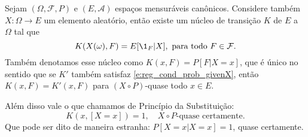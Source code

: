 \begin{corollary}
  \label{c:princ_substit}
  Sejam $(\Omega, \mathcal{F}, P)$ e $(E, \mathcal{A})$ espaços mensuráveis canônicos.
  Considere também $X: \Omega \to E$ um elemento aleatório, então existe um núcleo de transição $K$ de $E$ a $\Omega$ tal que
  \begin{equation}
    \label{e:reg_cond_prob_givenX}
    K(X(\omega), F) = E[\1_{F} | X], \text{ para todo $F \in \mathcal{F}$}.
  \end{equation}
  Também denotamos esse núcleo como $K(x, F) = P[F | X = x]$, que é único no sentido que se $K'$ também satisfaz \eqref{e:reg_cond_prob_givenX}, então $K(x, F) = K'(x, F)$ para $(X \circ P)$-quase todo $x \in E$.

  Além disso vale o que chamamos de Princípio da Substituição:
  \begin{equation}
    \label{e:princ_substit}
    K(x, [X = x]) = 1, \quad \text{$X \circ P$-quase certamente}.
  \end{equation}
  Que pode ser dito de maneira estranha: $P[X = x|X = x] = 1$, quase certamente.
\end{corollary}

